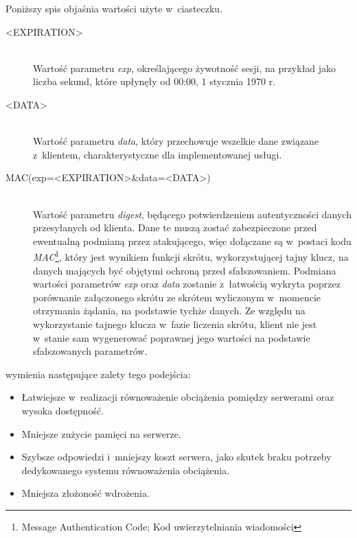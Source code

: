 \documentclass[11pt]{aghdpl}
\begin{document}
Poniższy spis objaśnia wartości użyte w~ciasteczku.
\begin{description}
\item[<EXPIRATION>] \hfill \\
Wartość parametru \emph{exp}, określającego żywotność sesji, na przykład jako liczba sekund, które upłynęły od 00:00, 1 stycznia 1970 r.
\item[<DATA>] \hfill \\
Wartość parametru \emph{data}, który przechowuje wszelkie dane związane z~klientem, charakterystyczne dla implementowanej usługi.
\item[MAC(exp=<EXPIRATION>\&data=<DATA>)] \hfill \\
Wartość parametru \emph{digest}, będącego potwierdzeniem autentyczności danych przesyłanych od klienta. Dane te muszą zostać zabezpieczone przed ewentualną podmianą przez atakującego, więc dołączane są w~postaci kodu \emph{MAC}\footnote{Message Authentication Code; Kod uwierzytelniania wiadomości}, który jest wynikiem funkcji skrótu, wykorzystującej tajny klucz, na danych mających być objętymi ochroną przed sfałszowaniem. Podmiana wartości parametrów \emph{exp} oraz \emph{data} zostanie z~łatwością wykryta poprzez porównanie załączonego skrótu ze skrótem wyliczonym w~momencie otrzymania żądania, na podstawie tychże danych. Ze względu na wykorzystanie tajnego klucza w~fazie liczenia skrótu, klient nie jest w~stanie sam wygenerować poprawnej jego wartości na podstawie sfałszowanych parametrów.
\end{description}

\cite{SeMa08} wymienia następujące zalety tego podejścia:
\begin{itemize}
\item Łatwiejsze w~realizacji równoważenie obciążenia pomiędzy serwerami oraz wysoka dostępność.
\item Mniejsze zużycie pamięci na serwerze.
\item Szybsze odpowiedzi i~mniejszy koszt serwera, jako skutek braku potrzeby dedykowanego systemu równoważenia obciążenia.
\item Mniejsza złożoność wdrożenia.
\end{itemize}
\end{document}
